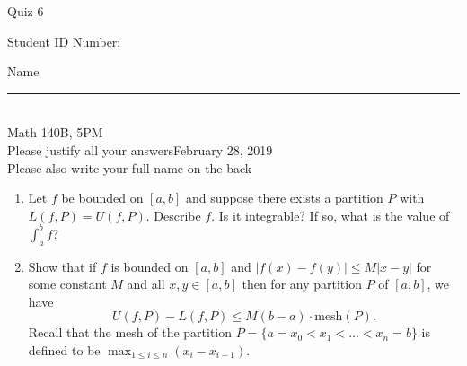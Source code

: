 \documentclass[12pt]{article}
\begin{document}
\begin{flushleft} 
\centerline{\LARGE{Quiz 6}} 
\vspace{5 mm}
{Student ID Number:}\hfill  
{Name \rule {2 in}{0.01in}}\\
Math 140B, 5PM
\\
{Please justify all your answers}\hfill {February 28, 2019}
\\
{Please also write your full name on the back} 

\medskip
\end{flushleft}


\begin{enumerate}
	\item Let $f$ be bounded on $[a,b]$ and suppose there exists a partition $P$ with $L(f, P) = U(f, P)$. Describe $f$. Is it integrable? If so, what is the value of $\int_a^bf$?
	\vfill
	\item Show that if $f$ is bounded on $[a,b]$ and $|f(x)-f(y)|\leq M|x-y|$ for some constant $M$ and all $x,y\in [a,b]$ then for any partition $P$ of $[a,b]$, we have
	$$U(f, P) - L(f,P) \leq M(b-a)\cdot \text{mesh}(P).$$
	Recall that the mesh of the partition $P = \{a=x_0<x_1<\ldots < x_n = b\}$ is defined to be $\max_{1\leq i\leq n}(x_i - x_{i-1})$.
	\vfill
\end{enumerate}


\end{document}
